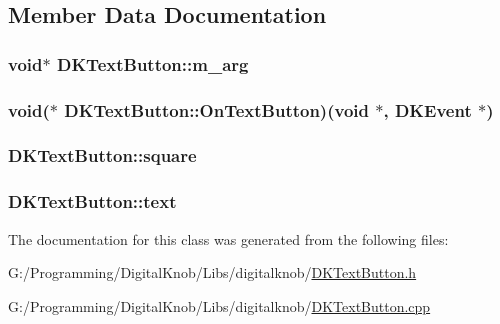 \subsection{Member Data Documentation}
\hypertarget{class_d_k_text_button_ab82fe6e9f84d902c1d2139f889a92e02}{
\subsubsection[{m\-\_\-arg}]{\setlength{\rightskip}{0pt plus 5cm}void$\ast$ D\-K\-Text\-Button\-::m\-\_\-arg}}\label{class_d_k_text_button_ab82fe6e9f84d902c1d2139f889a92e02}
\hypertarget{class_d_k_text_button_af353826e25d77af6419be6efae0ad978}{
\subsubsection[{On\-Text\-Button}]{\setlength{\rightskip}{0pt plus 5cm}void($\ast$ D\-K\-Text\-Button\-::\-On\-Text\-Button)(void $\ast$, {\bf D\-K\-Event} $\ast$)}}\label{class_d_k_text_button_af353826e25d77af6419be6efae0ad978}
\hypertarget{class_d_k_text_button_aa1ad37f6fe8792acbe9bc5cb90af26e8}{
\subsubsection[{square}]{ D\-K\-Text\-Button\-::square}}\label{class_d_k_text_button_aa1ad37f6fe8792acbe9bc5cb90af26e8}
\hypertarget{class_d_k_text_button_a74348ac1721ad5882f91b102a64271c2}{
\subsubsection[{text}]{ D\-K\-Text\-Button\-::text}}\label{class_d_k_text_button_a74348ac1721ad5882f91b102a64271c2}


The documentation for this class was generated from the following files\-:\begin{DoxyCompactItemize}
\item 
G\-:/\-Programming/\-Digital\-Knob/\-Libs/digitalknob/\hyperlink{_d_k_text_button_8h}{D\-K\-Text\-Button.\-h}\item 
G\-:/\-Programming/\-Digital\-Knob/\-Libs/digitalknob/\hyperlink{_d_k_text_button_8cpp}{D\-K\-Text\-Button.\-cpp}\end{DoxyCompactItemize}
